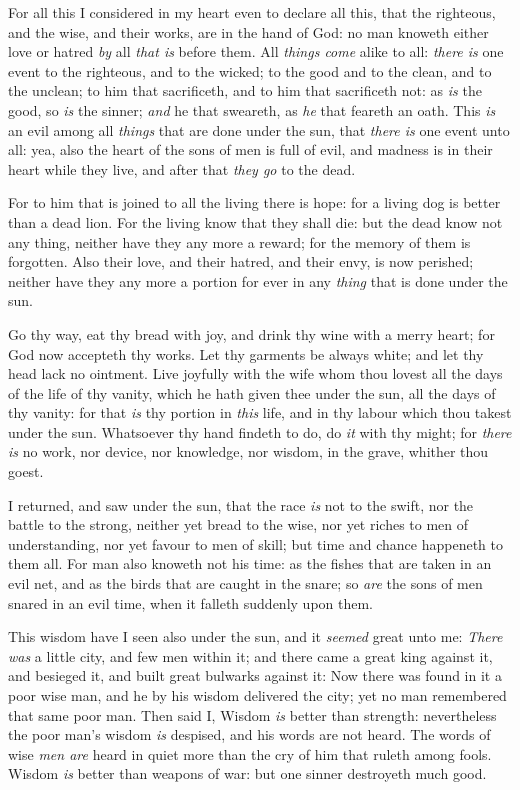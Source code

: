 \documentclass[11pt,letterpaper,oneside]{memoir}
\begin{document}
For all this I considered in my heart even to declare all this, that the 
righteous, and the wise, and their works, are in the hand of God: no man 
knoweth either love or hatred \emph{by} all \emph{that is} before them. 
All \emph{things come} alike to all: \emph{there is} one event to the 
righteous, and to the wicked; to the good and to the clean, and to the 
unclean; to him that sacrificeth, and to him that sacrificeth not: as 
\emph{is} the good, so \emph{is} the sinner; \emph{and} he that 
sweareth, as \emph{he} that feareth an oath. This \emph{is} an evil 
among all \emph{things} that are done under the sun, that \emph{there 
is} one event unto all: yea, also the heart of the sons of men is full 
of evil, and madness is in their heart while they live, and after that 
\emph{they go} to the dead. 

For to him that is joined to all the living there is hope: for a living 
dog is better than a dead lion. For the living know that they shall die: 
but the dead know not any thing, neither have they any more a reward; 
for the memory of them is forgotten. Also their love, and their hatred, 
and their envy, is now perished; neither have they any more a portion 
for ever in any \emph{thing} that is done under the sun. 

Go thy way, eat thy bread with joy, and drink thy wine with a merry 
heart; for God now accepteth thy works. Let thy garments be always 
white; and let thy head lack no ointment. Live joyfully with the wife 
whom thou lovest all the days of the life of thy vanity, which he hath 
given thee under the sun, all the days of thy vanity: for that \emph{is} 
thy portion in \emph{this} life, and in thy labour which thou takest 
under the sun. Whatsoever thy hand findeth to do, do \emph{it} with thy 
might; for \emph{there is} no work, nor device, nor knowledge, nor 
wisdom, in the grave, whither thou goest. 

I returned, and saw under the sun, that the race \emph{is} not to the 
swift, nor the battle to the strong, neither yet bread to the wise, nor 
yet riches to men of understanding, nor yet favour to men of skill; but 
time and chance happeneth to them all. For man also knoweth not his 
time: as the fishes that are taken in an evil net, and as the birds that 
are caught in the snare; so \emph{are} the sons of men snared in an evil 
time, when it falleth suddenly upon them. 

This wisdom have I seen also under the sun, and it \emph{seemed} great 
unto me: \emph{There was} a little city, and few men within it; and 
there came a great king against it, and besieged it, and built great 
bulwarks against it: Now there was found in it a poor wise man, and he 
by his wisdom delivered the city; yet no man remembered that same poor 
man. Then said I, Wisdom \emph{is} better than strength: nevertheless 
the poor man's wisdom \emph{is} despised, and his words are not heard. 
The words of wise \emph{men are} heard in quiet more than the cry of him 
that ruleth among fools. Wisdom \emph{is} better than weapons of war: 
but one sinner destroyeth much good. 
\end{document}
